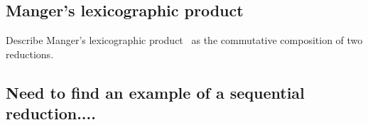

\subsection{Manger's lexicographic product}


Describe Manger's lexicographic product~\cite{manger:2020}
as the commutative composition of two reductions. 


\subsection{Need to find an example of a sequential reduction....} 
